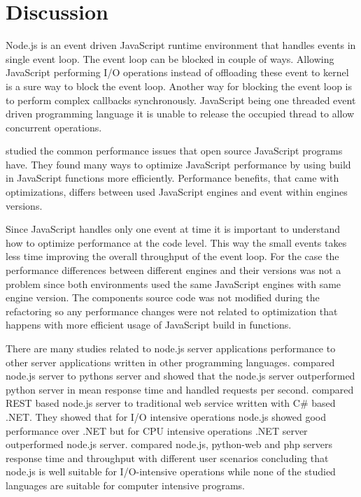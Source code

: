 \chapter{Discussion\label{discussion}}
Node.js is an event driven JavaScript runtime environment that handles events in single event loop.
The event loop can be blocked in couple of ways.
Allowing JavaScript performing I/O operations instead of offloading these event to kernel is a sure way to block the event loop.
Another way for blocking the event loop is to perform complex callbacks synchronously.
JavaScript being one threaded event driven programming language it is unable to release the occupied thread to allow concurrent operations.

\cite{SelakovicPerformanceIssues} studied the common performance issues that open source JavaScript programs have.
They found many ways to optimize JavaScript performance by using build in JavaScript functions more efficiently.
Performance benefits, that came with optimizations, differs between used JavaScript engines and event within engines versions.

Since JavaScript handles only one event at time it is important to understand how to optimize performance at the code level.
This way the small events takes less time improving the overall throughput of the event loop.
For the case the performance differences between different engines and their versions was not a problem since both environments used the same JavaScript engines with same engine version.
The components source code was not modified during the refactoring so any performance changes were not related to optimization that happens with more efficient usage of JavaScript build in functions.

There are many studies related to node.js server applications performance to other server applications written in other programming languages.
\cite{Challapalli} compared node.js server to pythons server and showed that the node.js server outperformed python server in mean response time and handled requests per second.
\cite{Chitra} compared REST based node.js server to traditional web service written with C\# based .NET.
They showed that for I/O intensive operations node.js showed good performance over .NET but
for CPU intensive operations .NET server outperformed node.js server.
\cite{Lei} compared node.js, python-web and php servers response time and throughput with different user scenarios concluding that node.js is well suitable for I/O-intensive operations while none of the studied languages are suitable for computer intensive programs.

